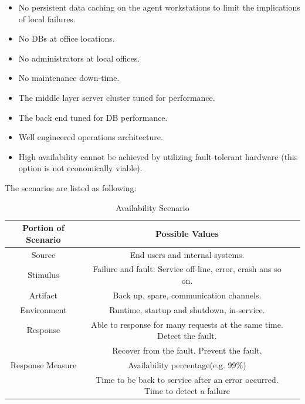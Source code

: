 \documentclass{article}
\begin{document}
	\begin{itemize}
		\item No persistent data caching on the agent workstations to limit the implications of local failures.
		\item No DBs at office locations.
		\item No administrators at local offices.
		\item No maintenance down-time.
		\item The middle layer server cluster tuned for performance.
		\item The back end tuned for DB performance.
		\item Well engineered operations architecture.
		\item High availability cannot be achieved by utilizing fault-tolerant hardware (this option is not
		economically viable).
	\end{itemize}
	The scenarios are listed as following:

	\begin{center}
		\begin{table}[!htb]
		\begin{tabular}{ccc}
		\toprule  
		Portion of Scenario & Possible Values\\
		\midrule 
		Source & End users and internal systems.\\
		Stimulus & Failure and fault: Service off-line, error, crash ans so on.\\
		Artifact & Back up, spare, communication channels.\\
		Environment & Runtime, startup and shutdown, in-service.\\
		Response & Able to response for many requests at the same time. Detect the fault. \\
		& Recover from the fault. Prevent the fault. \\		
		Response Measure & Availability percentage(e.g. 99\%) \\
		& Time to be back to service after an error occurred. Time to detect a failure \\
		\bottomrule
		\end{tabular}
		\caption{Availability Scenario}
		\end{table}
	\end{center}
\end{document}

